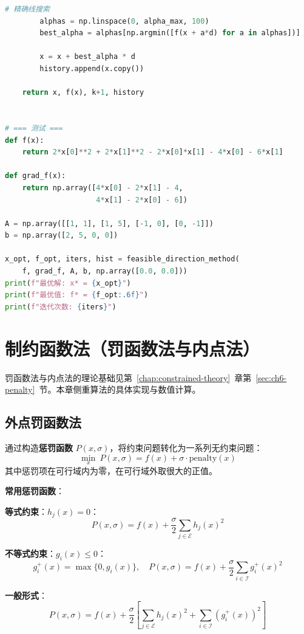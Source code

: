 \begin{lstlisting}[language=Python, caption=可行方向法实现]
        # 精确线搜索
        alphas = np.linspace(0, alpha_max, 100)
        best_alpha = alphas[np.argmin([f(x + a*d) for a in alphas])]
        
        x = x + best_alpha * d
        history.append(x.copy())
    
    return x, f(x), k+1, history


# === 测试 ===
def f(x):
    return 2*x[0]**2 + 2*x[1]**2 - 2*x[0]*x[1] - 4*x[0] - 6*x[1]

def grad_f(x):
    return np.array([4*x[0] - 2*x[1] - 4, 
                     4*x[1] - 2*x[0] - 6])

A = np.array([[1, 1], [1, 5], [-1, 0], [0, -1]])
b = np.array([2, 5, 0, 0])

x_opt, f_opt, iters, hist = feasible_direction_method(
    f, grad_f, A, b, np.array([0.0, 0.0]))
print(f"最优解: x* = {x_opt}")
print(f"最优值: f* = {f_opt:.6f}")
print(f"迭代次数: {iters}")
\end{lstlisting}

\section{制约函数法（罚函数法与内点法）}\label{sec:ch7-penalty}

罚函数法与内点法的理论基础见第~\ref{chap:constrained-theory}~章第~\ref{sec:ch6-penalty}~节。本章侧重算法的具体实现与数值计算。

\subsection{外点罚函数法}

\begin{conceptbox}[外点罚函数法思想]
通过构造\textbf{惩罚函数} $P(x, \sigma)$，将约束问题转化为一系列无约束问题：
\[
\min_x\ P(x, \sigma) = f(x) + \sigma \cdot \text{penalty}(x)
\]
其中惩罚项在可行域内为零，在可行域外取很大的正值。
\end{conceptbox}

\textbf{常用惩罚函数}：

\textbf{等式约束}：$h_j(x) = 0$：
\[
P(x, \sigma) = f(x) + \frac{\sigma}{2}\sum_{j \in \mathcal{E}} h_j(x)^2
\]

\textbf{不等式约束}：$g_i(x) \leq 0$：
\[
g_i^+(x) = \max\{0, g_i(x)\},\quad
P(x, \sigma) = f(x) + \frac{\sigma}{2}\sum_{i \in \mathcal{I}} g_i^+(x)^2
\]

\textbf{一般形式}：
\[
P(x, \sigma) = f(x) + \frac{\sigma}{2}\left[\sum_{j \in \mathcal{E}} h_j(x)^2 + \sum_{i \in \mathcal{I}} (g_i^+(x))^2\right]
\]


